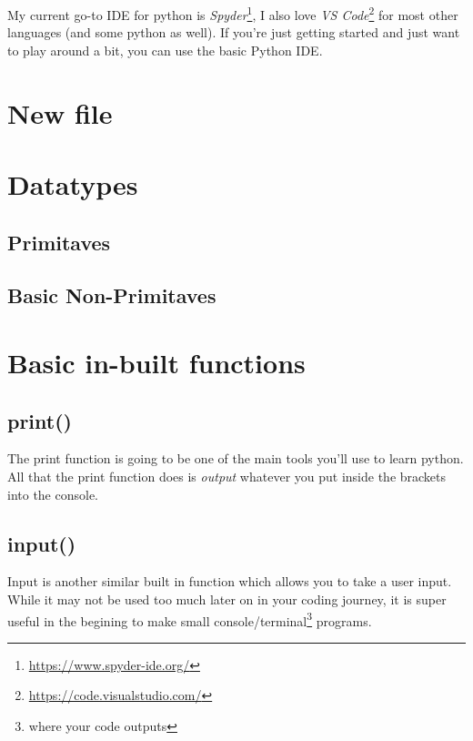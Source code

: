 \documentclass[12pt,a4paper]{book}
\begin{document}
			My current go-to IDE for python is \textit{Spyder}\footnote{\url{https://www.spyder-ide.org/}}, I also love \textit{VS Code}\footnote{\url{https://code.visualstudio.com/}} for most other languages (and some python as well). If you're just getting started and just want to play around a bit, you can use the basic Python IDE.
		\section{New file}
		\section{Datatypes}
			\subsection{Primitaves} 
			\subsection{Basic Non-Primitaves} 

		\section{Basic in-built functions} 
			\subsection{print()}
				The print function is going to be one of the main tools you'll use to learn python. All that the print function does is \textit{output} whatever you put inside the brackets into the console. 


			\subsection{input()}
				Input is another similar built in function which allows you to take a user input. While it may not be used too much later on in your coding journey, it is super useful in the begining to make small console/terminal\footnote{where your code outputs} programs.
				\vspace{7cm}
\end{document}
